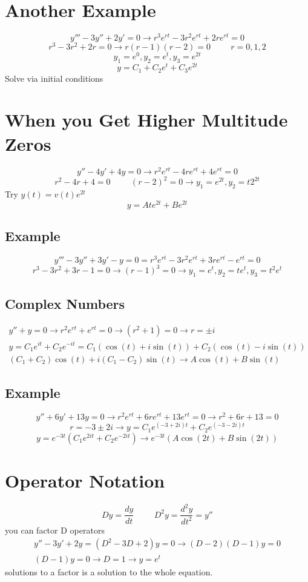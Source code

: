 \documentclass[fleqn]{report}
\newcommand{\hp}{\hspace{1cm}}
\newcommand{\equations} [1] {
\begin{gather*}
#1
\end{gather*}
}
\begin{document}
\section{Another Example}
\[
y''' - 3y'' + 2y' = 0
\rightarrow
r^3 e^{rt} - 3r^2e^{rt} + 2r e^{rt} = 0
\]
\[
r^3 - 3r^2 + 2r = 0 
\rightarrow
r(r - 1)(r - 2) = 0
\hp
r = 0, 1, 2
\]
\[
y_1 = e^0 , y_2 = e^t, y_3 = e^{2t}
\]
\[
y = C_1 + C_2e^t + C_3 e^{2t}
\]
Solve via initial conditions


\section{When you Get Higher Multitude Zeros}
\[
y'' - 4y' + 4y = 0
\rightarrow 
r^2 e^{rt} - 4re^{rt} + 4e^{rt} = 0
\]
\[
r^2 - 4r + 4 = 0
\hp 
(r - 2)^2 = 0
\rightarrow
y_1 = e^{2t},
y_2 = t2^{2t}
\]
Try $y(t) = v(t) e^{2t}$
\[
y = Ate^{2t} + Be^{2t}
\]


\subsection{Example}
\[
y''' - 3y'' + 3y' - y = 0
=
r^3 e^{rt} - 3r^2 e^{rt} + 3r e^{rt} - e^{rt} = 0
\]
\[
r^3 - 3r^2 + 3r - 1 = 0
\rightarrow
(r - 1)^3 = 0
\rightarrow
y_1 = e^t ,
y_2 = te^{t},
y_3 = t^2 e^t
\]

\newpage
\subsection{Complex Numbers}
\equations{
y'' + y = 0
\rightarrow
r^2 e^{rt} + e^{rt} = 0
\rightarrow
(r^2 + 1) = 0
\rightarrow
r = \pm i
\\
y = C_1 e^{it} + C_2 e^{-it}
=
C_1 (\cos (t) + i \sin(t)) + 
C_2 (\cos (t) - i \sin (t))
\\
(C_1 + C_2) \cos (t) + i(C_1 - C_2) \sin (t)
\rightarrow
A \cos(t) + B \sin (t)
}

\subsection{Example}
\[
y'' + 6y' + 13y = 0
\rightarrow
r^2 e^{r t} + 6r e^{r t} + 13 e^{r t} = 0
\rightarrow
r^2 + 6r + 13 = 0
\]
\[
r = -3 \pm 2i
\rightarrow
y = C_1 e^{(-3 + 2i)t} + C_2 e^{(-3 - 2i)t}
\]
\[
y = e^{-3t} \left( C_1 e^{2it} + C_2 e^{-2it} \right)
\rightarrow
e^{-3t} \left( A \cos(2t) + B \sin(2t) \right)
\]


\section{Operator Notation}
\[
Dy = \frac{dy}{dt}
\hp
D^2y = \frac{d^2y}{dt^2} = y''
\]
you can factor D operators
\begin{gather*}
y'' - 3y' + 2y  = (D^2 - 3D + 2)y = 0
\rightarrow
(D-2)(D - 1)y = 0
\\
(D - 1)y = 0 \rightarrow
D = 1
\rightarrow
y = e^{t}
\end{gather*}
solutions to a factor is a solution to the whole equation.
\end{document}
